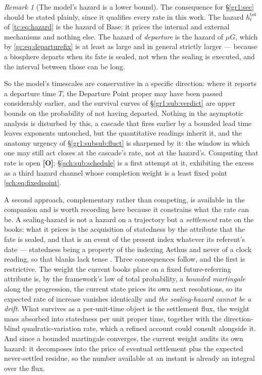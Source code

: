 \documentclass[11pt]{article}
\numberwithin{equation}{section}
\theoremstyle{plain}
\theoremstyle{definition}
\theoremstyle{remark}
\newtheorem{remark}[theorem]{Remark}
\begin{document}
\begin{remark}[The model's hazard is a lower bound]
\label{gc:rem:hazardlower}
The consequence for \S\ref{gr1:sec} should be stated plainly, since it
qualifies every rate in this work. The hazard $h^{\mathrm{tot}}_t$ of
\eqref{tc:eq:hazard} is the hazard of $\mathrm{Base}$: it prices the
internal and external mechanisms and nothing else. The hazard of
\emph{departure} is the hazard of $\mu G$, which by
\eqref{gc:eq:departurefix} is at least as large and in general strictly
larger --- because a biosphere departs when its fate is sealed, not
when the sealing is executed, and the interval between those can be
long.

So the model's timescales are conservative in a specific direction:
where it reports a departure time $T$, the Departure Point proper may
have been passed considerably earlier, and the survival curves of
\S\ref{gr1:sub:verdict} are upper bounds on the probability of not
having departed. Nothing in the asymptotic analysis is disturbed by
this, a cascade that fires earlier by a bounded lead time leaves
exponents untouched, but the quantitative readings inherit it, and
the anatomy urgency of \S\ref{gr1:subsub:fluct} is sharpened by it: the
window in which one may still act closes at the cascade's rate, not at
the hazard's. Computing that rate is open \textbf{[O]};
\S\ref{sch:sub:schedule} is a first attempt at it, exhibiting the excess
as a third hazard channel whose completion weight is a least fixed point
\eqref{sch:eq:fixedpoint}.

A second approach, complementary rather than competing, is available in
the companion and is worth recording here because it constrains what the
rate can be. A sealing-hazard is not a hazard on a trajectory but a
\emph{settlement} rate on the books: what it prices is the acquisition of
statedness by the attribute that the fate is sealed, and that is an
event of the present index whatever its referent's date --- statedness
being a property of the indexing Aethus and never of a clock reading, so
that blanks lack tense \cite{Aethus, AethusDecision}. Three consequences follow, and the first is
restrictive. The weight the current books place on a fixed
future-referring attribute is, by the framework's law of total
probability, a \emph{bounded martingale} along the progression, the
current state prices its own next resolutions, so its expected rate of
increase vanishes identically and \emph{the sealing-hazard cannot be a
drift}. What survives as a per-unit-time object is the settlement flux,
the weight mass absorbed into statedness per unit proper time, together
with the direction-blind quadratic-variation rate, which a refined
account could consult alongside it. And since a bounded martingale
converges, the current weight audits its own hazard: it decomposes into
the price of eventual settlement plus the expected never-settled residue,
so the number available at an instant is already an integral over the
flux.


\end{remark}
\end{document}
